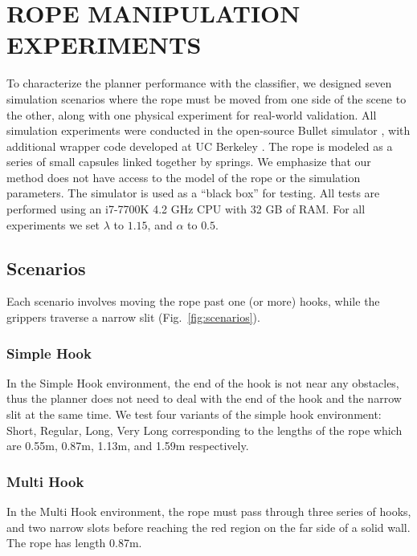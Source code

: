 

\section{ROPE MANIPULATION EXPERIMENTS}


To characterize the planner performance with the classifier, we designed seven simulation scenarios where the rope must be moved from one side of the scene to the other, along with one physical experiment for real-world validation.
All simulation experiments were conducted in the open-source Bullet simulator \cite{Coumans2010}, with additional wrapper code developed at UC Berkeley \cite{ucberkley_bullet}. The rope is modeled as a series of small capsules linked together by springs. We emphasize that our method does not have access to the model of the rope or the simulation parameters. The simulator is used as a ``black box'' for testing. All tests are performed using an i7-7700K 4.2 GHz CPU with 32 GB of RAM. For all experiments we set $\lambda$ to $1.15$, and $\alpha$ to $0.5$.



\subsection{Scenarios}


Each scenario involves moving the rope past one (or more) hooks, while the grippers traverse a narrow slit (Fig.~\ref{fig:scenarios}).

\subsubsection{Simple Hook}

In the Simple Hook environment, the end of the hook is not near any obstacles, thus the planner does not need to deal with the end of the hook and the narrow slit at the same time. We test four variants of the simple hook environment: Short, Regular, Long, Very Long corresponding to the lengths of the rope which are 0.55m, 0.87m, 1.13m, and 1.59m respectively.

\subsubsection{Multi Hook}

In the Multi Hook environment, the rope must pass through three series of hooks, and two narrow slots before reaching the red region on the far side of a solid wall. The rope has length 0.87m.

